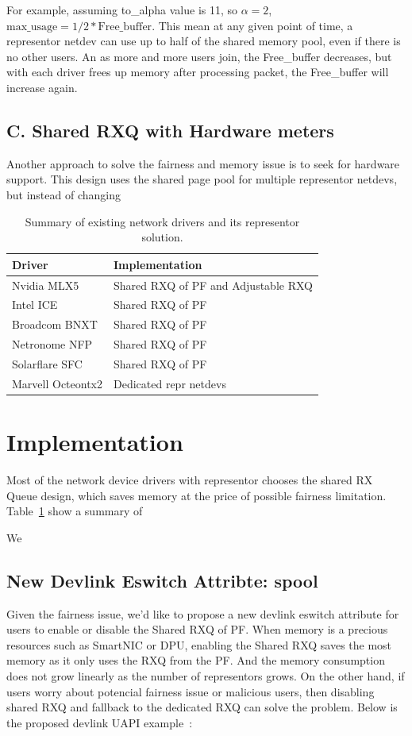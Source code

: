 \documentclass[letterpaper]{article}
\begin{document}
For example, assuming to\_alpha value is 11, so $\alpha = 2$, $ \text{max\_usage}
= 1/2 * \text{Free\_buffer} $.
This mean at any given point of time, a representor netdev can use up to half of
the shared memory pool, even if there is no other users. An as more and more
users join, the Free\_buffer decreases, but with each driver frees up memory
after processing packet, the Free\_buffer will increase again.

\subsection{C. Shared RXQ with Hardware meters}
Another approach to solve the fairness and memory issue is to seek for hardware
support. This design uses the shared page pool for multiple representor netdevs,
but instead of changing 

\begin{table}[h!]
\centering
\footnotesize
\begin{tabular}{|l|p{3.6cm}|} \hline
\textbf{Driver} &  \textbf{Implementation}\\ \hline \hline
Nvidia MLX5 & Shared RXQ of PF and \newline Adjustable RXQ \\ \hline
Intel ICE & Shared RXQ of PF~\cite{icepatch} \\ \hline
Broadcom BNXT & Shared RXQ of PF ~\cite{survey} \\ \hline
Netronome NFP & Shared RXQ of PF~\cite{survey} \\ \hline
Solarflare SFC &  Shared RXQ of PF~\cite{survey} \\ \hline
Marvell Octeontx2 & Dedicated repr netdevs~\cite{octeontx2} \\ \hline
\end{tabular}
\caption{Summary of existing network drivers and its representor solution.}
\label{tab:vendors}
\end{table}

\section{Implementation}
Most of the network device drivers with representor chooses the shared
RX Queue design, which saves memory at the price of possible
fairness limitation. Table~\ref{tab:vendors} show a summary of 

We 
\subsection{New Devlink Eswitch Attribte: spool}
Given the fairness issue, we'd like to propose a new devlink eswitch attribute
for users to enable or disable the Shared RXQ of PF.
When memory is a precious resources such as SmartNIC or DPU, enabling the Shared RXQ
saves the most memory as it only uses the RXQ from the PF. And the memory consumption
does not grow linearly as the number of representors grows.
On the other hand, if users worry about potencial fairness issue or malicious users,
then disabling shared RXQ and fallback to the dedicated RXQ can solve the problem.
Below is the proposed devlink UAPI example~\cite{spool}:
\end{document}

